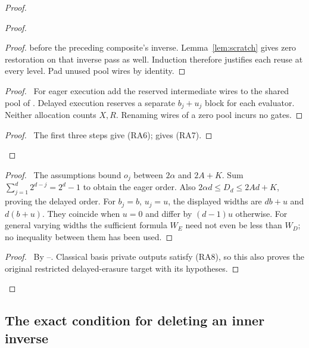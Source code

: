 \begin{proof}
\begin{proof}
\begin{proof}
 before the preceding composite's inverse. Lemma~\ref{lem:scratch}
 gives zero restoration on that inverse pass as well. Induction
 therefore justifies each reuse at every level. Pad unused pool
 wires by identity.\end{proof}
 \begin{proof}\pf\ For eager execution add the reserved intermediate
 wires to the shared pool of .
 Delayed execution reserves a separate $b_j+u_j$ block for each
 evaluator. Neither allocation counts $X,R$. Renaming wires of
 a zero pool incurs no gates.\end{proof}
 \qedstep
 \begin{proof}\pf\ The first three steps give (RA6);
  gives (RA7).\end{proof}
\end{proof}
 \begin{proof}\pf\ The assumptions bound $o_j$ between $2\alpha$
 and $2A+K$. Sum $\sum_{j=1}^d2^{d-j}=2^d-1$ to obtain the eager
 order. Also $2\alpha d\leq D_d\leq2Ad+K$, proving the delayed
 order. For $b_j=b$, $u_j=u$, the displayed widths are
 $db+u$ and $d(b+u)$. They coincide when $u=0$ and differ by
 $(d-1)u$ otherwise. For general varying widths the sufficient
 formula $W_E$ need not even be less than $W_D$; no inequality
 between them has been used.\end{proof}
 \qedstep
 \begin{proof}\pf\ By --.
 Classical basis private outputs satisfy (RA8), so this also proves
 the original restricted delayed-erasure target with its hypotheses.
 \end{proof}
\end{proof}

\subsection{The exact condition for deleting an inner inverse}

